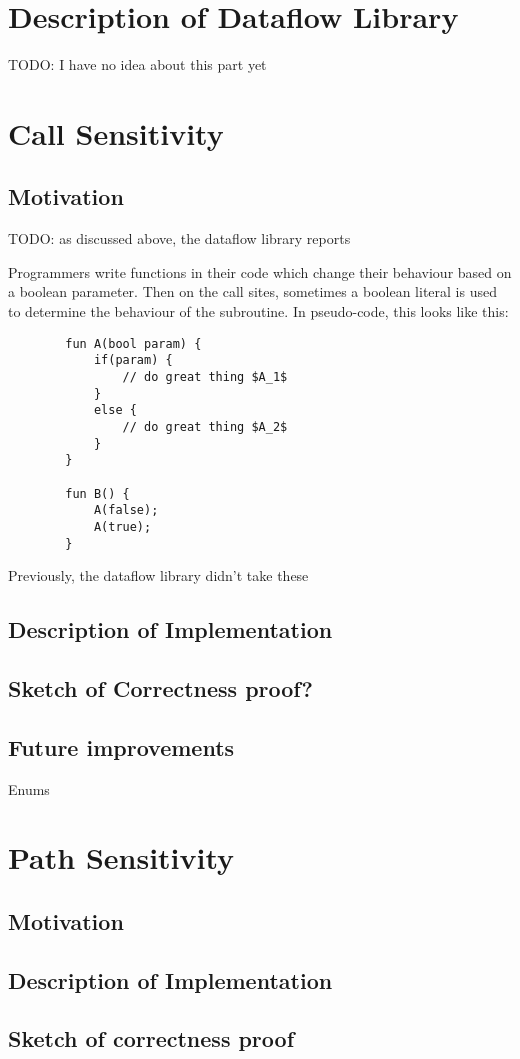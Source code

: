\newpage
\section{Description of Dataflow Library}
TODO: I have no idea about this part yet

\newpage
\section{Call Sensitivity}
\subsection{Motivation}
TODO: as discussed above, the dataflow library reports 

Programmers write functions in their code which change their behaviour based on 
a boolean parameter.
Then on the call sites, sometimes a boolean literal is used to determine the behaviour
of the subroutine.
In pseudo-code, this looks like this:
\begin{verbatim}
        fun A(bool param) {
            if(param) {
                // do great thing $A_1$
            }
            else {
                // do great thing $A_2$
            }
        }

        fun B() {
            A(false);
            A(true);
        }
\end{verbatim}


Previously, the dataflow library didn't take these 


\subsection{Description of Implementation}
\subsection{Sketch of Correctness proof?}
\subsection{Future improvements}
Enums

\newpage
\section{Path Sensitivity}
\subsection{Motivation}
\subsection{Description of Implementation}
\subsection{Sketch of correctness proof}




